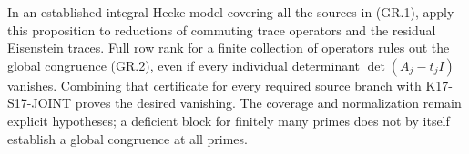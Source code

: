 In an established integral Hecke model covering all the
sources in (GR.1), apply this proposition to reductions
of commuting trace operators and the residual Eisenstein
traces. Full row rank for a finite collection of operators
rules out the global congruence (GR.2), even if every
individual determinant $\det(A_j-t_jI)$ vanishes.
Combining that certificate for every required source
branch with K17-S17-JOINT proves the desired vanishing.
The coverage and normalization remain explicit hypotheses;
a deficient block for finitely many primes does not by
itself establish a global congruence at all primes.

